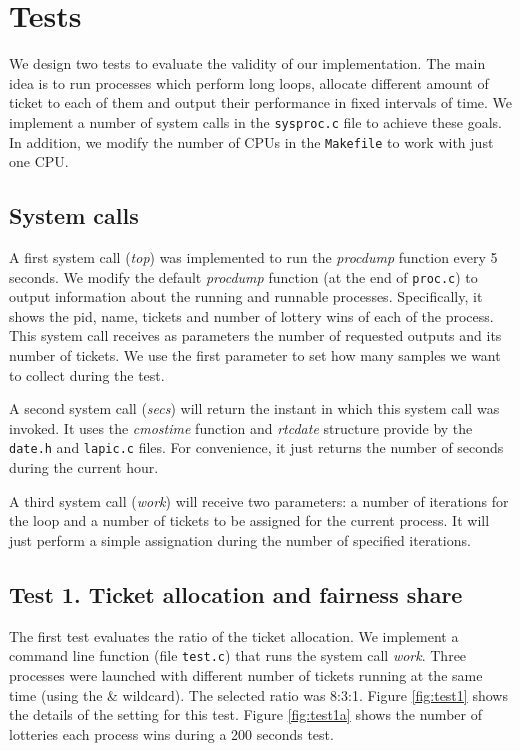 \documentclass[10pt]{scrartcl}
\begin{document}
\section{Tests}

We design two tests to evaluate the validity of our implementation. The main idea is to run processes which  perform long loops, allocate different amount of ticket to each of them and output their performance in fixed intervals of time.  We implement a number of system calls in the \texttt{sysproc.c} file to achieve these goals.  In addition, we modify the number of CPUs in the \texttt{Makefile} to work with just one CPU.

\subsection{System calls}
A first system call (\textit{top}) was implemented to run the \textit{procdump} function every 5 seconds. We modify the default \textit{procdump} function (at the end of \texttt{proc.c}) to output information about the running and runnable processes.  Specifically, it shows the pid, name, tickets and number of lottery wins of each of the process. This system call receives as parameters the number of requested outputs and its number of tickets.  We use the first parameter to set how many samples we want to collect during the test.

A second system call (\textit{secs}) will return the instant in which this system call was invoked.  It uses the \textit{cmostime} function and \textit{rtcdate} structure provide by the \texttt{date.h} and \texttt{lapic.c} files.  For convenience, it just returns the number of seconds during the current hour.

A third system call (\textit{work}) will receive two parameters: a number of iterations for the loop and a number of tickets to be assigned for the current process.  It will just perform a simple assignation during the number of specified iterations.

\subsection{Test 1. Ticket allocation and fairness share}
The first test evaluates the ratio of the ticket allocation.  We implement a command line function (file \texttt{test.c}) that runs the system call \textit{work}.  Three processes were launched with different number of tickets running at the same time (using the \& wildcard).  The selected ratio was 8:3:1.  Figure \ref{fig:test1} shows the details of the setting for this test. Figure \ref{fig:test1a} shows the number of lotteries each process wins during a 200 seconds test. 
\end{document}
